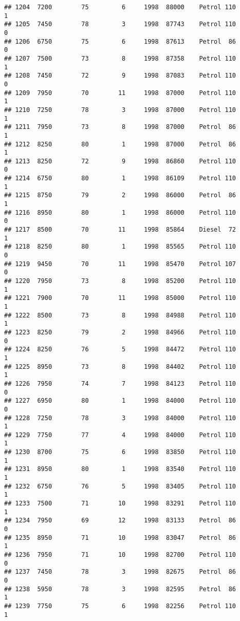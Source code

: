 \documentclass[]{article}
\begin{document}
\begin{verbatim}
## 1204  7200        75         6     1998  88000    Petrol 110         1
## 1205  7450        78         3     1998  87743    Petrol 110         0
## 1206  6750        75         6     1998  87613    Petrol  86         0
## 1207  7500        73         8     1998  87358    Petrol 110         1
## 1208  7450        72         9     1998  87083    Petrol 110         0
## 1209  7950        70        11     1998  87000    Petrol 110         1
## 1210  7250        78         3     1998  87000    Petrol 110         1
## 1211  7950        73         8     1998  87000    Petrol  86         1
## 1212  8250        80         1     1998  87000    Petrol  86         1
## 1213  8250        72         9     1998  86860    Petrol 110         0
## 1214  6750        80         1     1998  86109    Petrol 110         1
## 1215  8750        79         2     1998  86000    Petrol  86         1
## 1216  8950        80         1     1998  86000    Petrol 110         0
## 1217  8500        70        11     1998  85864    Diesel  72         1
## 1218  8250        80         1     1998  85565    Petrol 110         0
## 1219  9450        70        11     1998  85470    Petrol 107         0
## 1220  7950        73         8     1998  85200    Petrol 110         1
## 1221  7900        70        11     1998  85000    Petrol 110         1
## 1222  8500        73         8     1998  84988    Petrol 110         1
## 1223  8250        79         2     1998  84966    Petrol 110         0
## 1224  8250        76         5     1998  84472    Petrol 110         1
## 1225  8950        73         8     1998  84402    Petrol 110         1
## 1226  7950        74         7     1998  84123    Petrol 110         0
## 1227  6950        80         1     1998  84000    Petrol 110         0
## 1228  7250        78         3     1998  84000    Petrol 110         1
## 1229  7750        77         4     1998  84000    Petrol 110         1
## 1230  8700        75         6     1998  83850    Petrol 110         1
## 1231  8950        80         1     1998  83540    Petrol 110         1
## 1232  6750        76         5     1998  83405    Petrol 110         1
## 1233  7500        71        10     1998  83291    Petrol 110         1
## 1234  7950        69        12     1998  83133    Petrol  86         0
## 1235  8950        71        10     1998  83047    Petrol  86         1
## 1236  7950        71        10     1998  82700    Petrol 110         0
## 1237  7450        78         3     1998  82675    Petrol  86         0
## 1238  5950        78         3     1998  82595    Petrol  86         1
## 1239  7750        75         6     1998  82256    Petrol 110         1

\end{verbatim}
\end{document}
